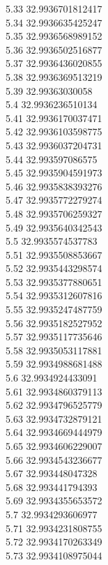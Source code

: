 {5.33	32.9936701812417\\
5.34	32.9936635425247\\
5.35	32.9936568989152\\
5.36	32.9936502516877\\
5.37	32.9936436020855\\
5.38	32.9936369513219\\
5.39	32.99363030058\\
5.4	32.9936236510134\\
5.41	32.9936170037471\\
5.42	32.9936103598775\\
5.43	32.9936037204731\\
5.44	32.993597086575\\
5.45	32.9935904591973\\
5.46	32.9935838393276\\
5.47	32.9935772279274\\
5.48	32.9935706259327\\
5.49	32.9935640342543\\
5.5	32.9935574537783\\
5.51	32.9935508853667\\
5.52	32.9935443298574\\
5.53	32.9935377880651\\
5.54	32.9935312607816\\
5.55	32.9935247487759\\
5.56	32.9935182527952\\
5.57	32.9935117735646\\
5.58	32.9935053117881\\
5.59	32.9934988681488\\
5.6	32.9934924433091\\
5.61	32.9934860379113\\
5.62	32.9934796525779\\
5.63	32.9934732879121\\
5.64	32.9934669444979\\
5.65	32.9934606229007\\
5.66	32.9934543236677\\
5.67	32.993448047328\\
5.68	32.993441794393\\
5.69	32.9934355653572\\
5.7	32.9934293606977\\
5.71	32.9934231808755\\
5.72	32.9934170263349\\
5.73	32.9934108975044\\
}
